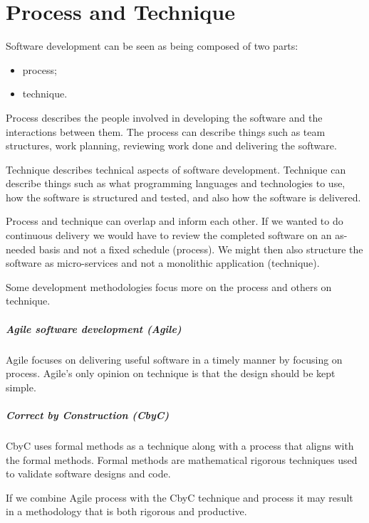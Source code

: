 
\chapter{Process and Technique} %

\label{Chapter_ Process_and_Technique} %


Software development can be seen as being composed of two parts: 
\begin{itemize}
	\item process;
	\item technique.
\end{itemize}

Process describes the people involved in developing the software and the 
interactions between them. The process can describe things such as team 
structures, work planning, reviewing work done and delivering the software. 

Technique describes technical aspects of software development. Technique can 
describe things such as what programming languages and technologies to use, 
how the software is structured and tested, and also how the software is delivered. 

Process and technique can overlap and inform each other. If we wanted to do 
continuous delivery we would have to review 
the completed software on an as-needed basis and not a fixed schedule (process). 
We might then also structure the software as micro-services and not a monolithic 
application (technique).

Some development methodologies focus more on the process and others on technique.

\paragraph*{Agile software development (Agile)}
Agile focuses on delivering useful software in a timely manner by focusing on process.
Agile's only opinion on technique is that the design should be kept simple.

\paragraph*{Correct by Construction (CbyC)}
CbyC uses formal methods as a technique along with a process that 
aligns with the formal methods. Formal methods are mathematical rigorous techniques
used to validate software designs and code.

If we combine Agile process with the CbyC technique and process
it may result in a methodology that is both rigorous and productive.
